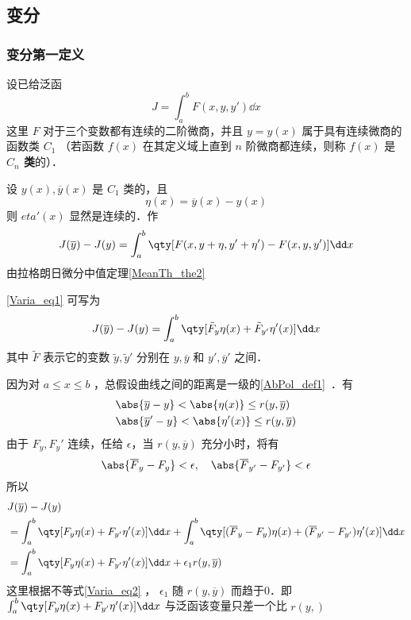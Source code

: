 \subsection{变分}
\subsubsection{变分第一定义}
设已给泛函
\begin{equation}
J=\int_a^b F(x,y,y')\dd x
\end{equation}
这里 $F$ 对于三个变数都有连续的二阶微商，并且 $y=y(x)$ 属于具有连续微商的函数类 $C_1$ （若函数 $f(x)$ 在其定义域上直到 $n$ 阶微商都连续，则称 $f(x)$ 是\textbf{ $C_n$ 类}的）．

设 $y(x),\overline{y}(x)$ 是 $C_1$ 类的，且
\begin{equation}
\eta(x)=\overline{y}(x)-y(x)
\end{equation}
则 $eta'(x)$ 显然是连续的．作
\begin{equation}\label{Varia_eq1}
J(\overline{y})-J(y)=\int_a^b\qty[F(x,y+\eta,y'+\eta')-F(x,y,y')]\dd x
\end{equation}
由拉格朗日微分中值定理\autoref{MeanTh_the2}~
\begin{issues}
\end{issues}
\autoref{Varia_eq1} 可写为
\begin{equation}
J(\overline{y})-J(y)=\int_a^b\qty[\tilde{F}_y\eta(x)+\tilde{F}_{y'}\eta'(x)]\dd x
\end{equation}
其中 $\tilde{F}$ 表示它的变数 $\tilde{y},\tilde{y}'$ 分别在 $y,\overline{y}$ 和 $y',\overline{y}'$ 之间．

因为对 $a\leq x\leq b$ ，总假设曲线之间的距离是一级的\autoref{AbPol_def1}~．有
\begin{equation}
\begin{aligned}
&\abs{\overline{y}-y}<\abs{\eta(x)}\leq r(y,\overline{y})\\
&\abs{\overline{y}'-y}<\abs{\eta'(x)}\leq r(y,\overline{y})
\end{aligned}
\end{equation}
由于 $F_y,F_y'$ 连续，任给 $\epsilon$，当 $r(y,\overline{y})$ 充分小时，将有
\begin{equation}\label{Varia_eq2}
\abs{\overline{F}_y-F_y}<\epsilon,\quad\abs{\overline{F}_{y'}-F_{y'}}<\epsilon
\end{equation}
所以
\begin{equation}
\begin{aligned}
&J(\overline{y})-J(y)\\
&=\int_a^b\qty[F_y\eta(x)+F_{y'}\eta'(x)]\dd x+\int_a^b\qty[(\overline{F}_y-F_y)\eta(x)+(\overline{F}_{y'}-F_{y'})\eta'(x)]\dd x\\
&=\int_a^b\qty[F_y\eta(x)+F_{y'}\eta'(x)]\dd x+\epsilon_1r(y,\overline{y})
\end{aligned}
\end{equation}
这里根据不等式\autoref{Varia_eq2} ， $\epsilon_1$ 随 $r(y,\overline{y})$ 而趋于0．即 $\int_a^b\qty[F_y\eta(x)+F_{y'}\eta'(x)]\dd x$ 与泛函该变量只差一个比 $r(y,)$